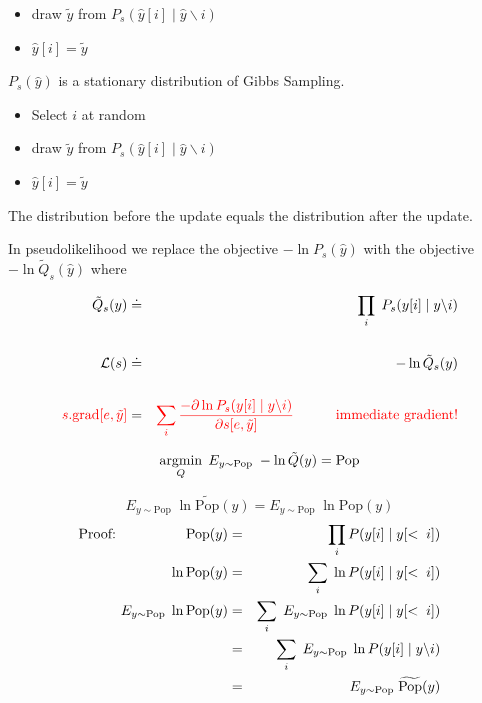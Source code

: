 {\begin{itemize}
\item draw $\tilde{y}$ from $P_s(\hat{y}[i] \;|\;\hat{y} \backslash i)$

\item $\hat{y}[i] = \tilde{y}$
\end{itemize}


$P_s(\hat{y})$ is a stationary distribution of Gibbs Sampling.

\vfill
\begin{itemize}
\item   Select $i$ at random

\item draw $\tilde{y}$ from $P_s(\hat{y}[i] \;|\;\hat{y} \backslash i)$

\item $\hat{y}[i] = \tilde{y}$
\end{itemize}


\vfill
The distribution before the update equals the distribution after the update.


In pseudolikelihood we replace the objective $- \ln P_s(\hat{y})$ with the objective $- \ln \tilde{Q}_s(\hat{y})$ where

\vfill
\begin{eqnarray*}
  \tilde{Q}_s(y) & \doteq & \prod_i \;P_s(y[i] \;|\;y\backslash i) \\
  \\
  {\cal L}(s) & \doteq & - \ln \tilde{Q}_s(y) \\
  \\
  {\color{red} s.\mathrm{grad}[e,\tilde{y}]} & = & {\color{red} \sum_i \frac{- \partial \ln P_s(y[i] \;|\;y\backslash i)}{\partial s[e,\tilde{y}]}
  \hspace{3em} \mbox{immediate gradient!}}
\end{eqnarray*}



$$\operatorname*{argmin}_Q \; E_{y \sim \mathrm{Pop}} \;-\ln \tilde{Q}(y) = \mathrm{Pop}$$

\vfill


{\color{red} $$E_{y \sim \mathrm{Pop}}\;\ln \widetilde{\mathrm{Pop}}(y) = E_{y \sim \mathrm{Pop}}\;\ln \mathrm{Pop}(y)$$}
{\huge
\begin{eqnarray*}
\mbox{Proof:}\hspace{5em}\mathrm{Pop}(y) & = & \prod_i P(y[i]\;|\; y[<\;i]) \\
\ln \mathrm{Pop}(y) & = & \sum_i \; \ln P(y[i]\;|\; y[<\;i]) \\
E_{y \sim \mathrm{Pop}}\;\ln \mathrm{Pop}(y) & = & \sum_i \;E_{y \sim \mathrm{Pop}} \; \ln P(y[i]\;|\; y[<\;i]) \\
& = & \sum_i \;E_{y \sim \mathrm{Pop}} \;\ln P(y[i]\;|\; y\backslash i) \\
& = & E_{y\sim \mathrm{Pop}}\;\widetilde{\mathrm{Pop}}(y)
\end{eqnarray*}
}

}
